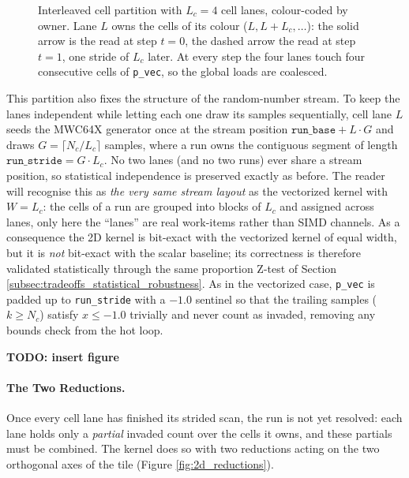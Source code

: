 \begin{figure}[htpb]
    \caption{Interleaved cell partition with $L_c = 4$ cell lanes, colour-coded by owner. Lane $L$ owns the cells of its colour ($L, L+L_c, \dots$): the solid arrow is the read at step $t=0$, the dashed arrow the read at step $t=1$, one stride of $L_c$ later. At every step the four lanes touch four consecutive cells of \texttt{p\_vec}, so the global loads are coalesced.}
    \label{fig:2d_interleaved}
\end{figure}

This partition also fixes the structure of the random-number stream. To keep the lanes independent while letting each one draw its samples sequentially, cell lane $L$ seeds the MWC64X generator once at the stream position $\texttt{run\_base} + L \cdot G$ and draws $G = \lceil N_c / L_c \rceil$ samples, where a run owns the contiguous segment of length $\texttt{run\_stride} = G \cdot L_c$. No two lanes (and no two runs) ever share a stream position, so statistical independence is preserved exactly as before. The reader will recognise this as \emph{the very same stream layout} as the vectorized kernel with $W = L_c$: the cells of a run are grouped into blocks of $L_c$ and assigned across lanes, only here the ``lanes'' are real work-items rather than SIMD channels. As a consequence the 2D kernel is bit-exact with the vectorized kernel of equal width, but it is \emph{not} bit-exact with the scalar baseline; its correctness is therefore validated statistically through the same proportion Z-test of Section \ref{subsec:tradeoffs_statistical_robustness}. As in the vectorized case, \texttt{p\_vec} is padded up to \texttt{run\_stride} with a $-1.0$ sentinel so that the trailing samples ($k \geq N_c$) satisfy $x \leq -1.0$ trivially and never count as invaded, removing any bounds check from the hot loop.

\textbf{TODO: insert figure}

\paragraph{The Two Reductions.}
Once every cell lane has finished its strided scan, the run is not yet resolved: each lane holds only a \emph{partial} invaded count over the cells it owns, and these partials must be combined. The kernel does so with two reductions acting on the two orthogonal axes of the tile (Figure \ref{fig:2d_reductions}).

